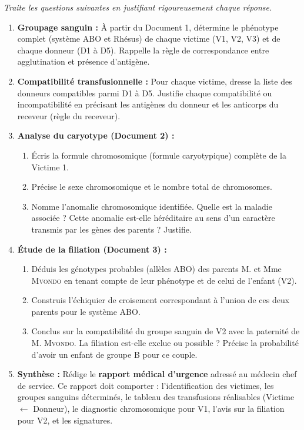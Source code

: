 \documentclass[11pt]{article}
\newcounter{popsec}
\newcounter{popsub}
\newcommand{\courssub}[1]{%
  \stepcounter{popsub}%
  \par\vspace{9pt}\noindent{\popxbold\fontsize{11.5}{13}\selectfont\color{popink}{\color{poporange}\thepopsec.\thepopsub}\hspace{6pt}#1}\par\nopagebreak\vspace{4pt}
}
\begin{document}
\courssub{Consignes}
\emph{Traite les questions suivantes en justifiant rigoureusement chaque réponse.}
\begin{enumerate}
    \item \textbf{Groupage sanguin :} À partir du Document 1, détermine le phénotype complet (système ABO et Rhésus) de chaque victime (V1, V2, V3) et de chaque donneur (D1 à D5). Rappelle la règle de correspondance entre agglutination et présence d'antigène.
    \item \textbf{Compatibilité transfusionnelle :} Pour chaque victime, dresse la liste des donneurs compatibles parmi D1 à D5. Justifie chaque compatibilité ou incompatibilité en précisant les antigènes du donneur et les anticorps du receveur (règle du receveur).
    \item \textbf{Analyse du caryotype (Document 2) :}
    \begin{enumerate}
        \item Écris la formule chromosomique (formule caryotypique) complète de la Victime 1.
        \item Précise le sexe chromosomique et le nombre total de chromosomes.
        \item Nomme l'anomalie chromosomique identifiée. Quelle est la maladie associée ? Cette anomalie est-elle héréditaire au sens d'un caractère transmis par les gènes des parents ? Justifie.
    \end{enumerate}
    \item \textbf{Étude de la filiation (Document 3) :}
    \begin{enumerate}
        \item Déduis les génotypes probables (allèles ABO) des parents M. et Mme \textsc{Mvondo} en tenant compte de leur phénotype et de celui de l'enfant (V2).
        \item Construis l'échiquier de croisement correspondant à l'union de ces deux parents pour le système ABO.
        \item Conclus sur la compatibilité du groupe sanguin de V2 avec la paternité de M. \textsc{Mvondo}. La filiation est-elle exclue ou possible ? Précise la probabilité d'avoir un enfant de groupe B pour ce couple.
    \end{enumerate}
    \item \textbf{Synthèse :} Rédige le \textbf{rapport médical d'urgence} adressé au médecin chef de service. Ce rapport doit comporter : l'identification des victimes, les groupes sanguins déterminés, le tableau des transfusions réalisables (Victime $\leftarrow$ Donneur), le diagnostic chromosomique pour V1, l'avis sur la filiation pour V2, et les signatures.
\end{enumerate}
\end{document}
